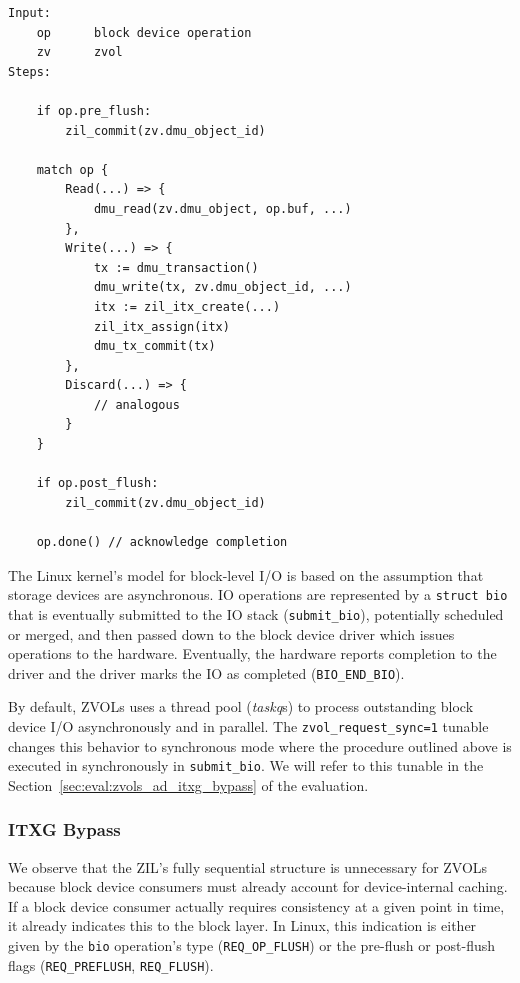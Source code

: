 \documentclass[12pt,a4paper,twoside]{book}
\begin{document}
\begin{lstlisting}[style=figurepseudocode]
Input:
    op      block device operation
    zv      zvol
Steps:

    if op.pre_flush:
        zil_commit(zv.dmu_object_id)

    match op {
        Read(...) => {
            dmu_read(zv.dmu_object, op.buf, ...)
        },
        Write(...) => {
            tx := dmu_transaction()
            dmu_write(tx, zv.dmu_object_id, ...)
            itx := zil_itx_create(...)
            zil_itx_assign(itx)
            dmu_tx_commit(tx)
        },
        Discard(...) => {
            // analogous
        }
    }

    if op.post_flush:
        zil_commit(zv.dmu_object_id)

    op.done() // acknowledge completion

\end{lstlisting}

The Linux kernel's model for block-level I/O is based on the assumption that storage devices are asynchronous.
IO operations are represented by a \lstinline[style=figurepseudocode]{struct bio} that is eventually submitted to the IO stack (\lstinline{submit_bio}), potentially scheduled or merged, and then passed down to the block device driver which issues operations to the hardware.
Eventually, the hardware reports completion to the driver and the driver marks the IO as completed (\lstinline{BIO_END_BIO}).

By default, ZVOLs uses a thread pool (\textit{taskq}s) to process outstanding block device I/O asynchronously and in parallel.
The \lstinline{zvol_request_sync=1} tunable changes this behavior to synchronous mode where the procedure outlined above is executed in synchronously in \lstinline{submit_bio}.
We will refer to this tunable in the Section~\ref{sec:eval:zvols_ad_itxg_bypass} of the evaluation.

\subsubsection{ITXG Bypass}

We observe that the ZIL's fully sequential structure is unnecessary for ZVOLs because block device consumers must already account for device-internal caching.
If a block device consumer actually requires consistency at a given point in time, it already \underline{} indicates this to the block layer.
In Linux, this indication is either given by the \lstinline{bio} operation's type (\lstinline{REQ_OP_FLUSH}) or the pre-flush or post-flush flags (\lstinline{REQ_PREFLUSH}, \lstinline{REQ_FLUSH}).
\end{document}
